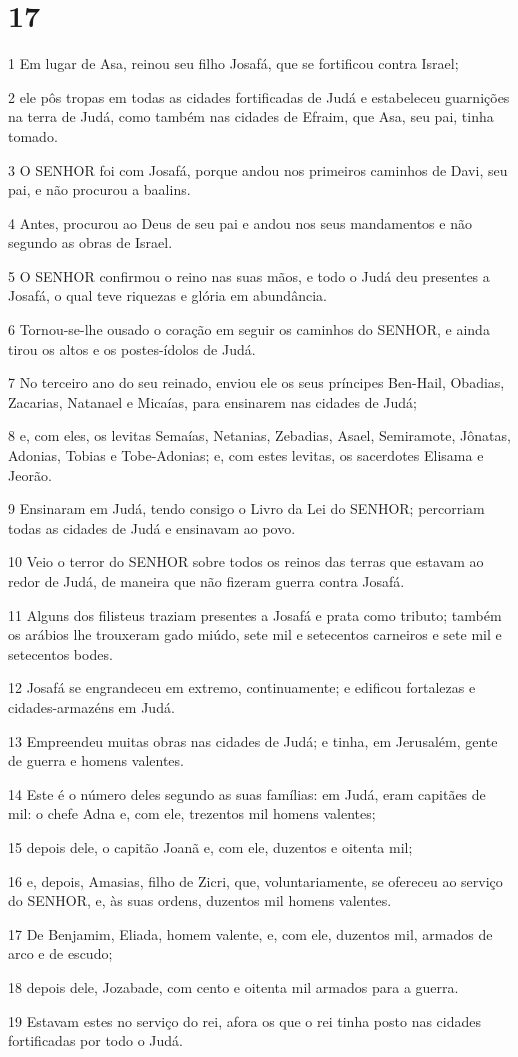 \chapter{17}

\par 1 Em lugar de Asa, reinou seu filho Josafá, que se fortificou contra Israel;
\par 2 ele pôs tropas em todas as cidades fortificadas de Judá e estabeleceu guarnições na terra de Judá, como também nas cidades de Efraim, que Asa, seu pai, tinha tomado.
\par 3 O SENHOR foi com Josafá, porque andou nos primeiros caminhos de Davi, seu pai, e não procurou a baalins.
\par 4 Antes, procurou ao Deus de seu pai e andou nos seus mandamentos e não segundo as obras de Israel.
\par 5 O SENHOR confirmou o reino nas suas mãos, e todo o Judá deu presentes a Josafá, o qual teve riquezas e glória em abundância.
\par 6 Tornou-se-lhe ousado o coração em seguir os caminhos do SENHOR, e ainda tirou os altos e os postes-ídolos de Judá.
\par 7 No terceiro ano do seu reinado, enviou ele os seus príncipes Ben-Hail, Obadias, Zacarias, Natanael e Micaías, para ensinarem nas cidades de Judá;
\par 8 e, com eles, os levitas Semaías, Netanias, Zebadias, Asael, Semiramote, Jônatas, Adonias, Tobias e Tobe-Adonias; e, com estes levitas, os sacerdotes Elisama e Jeorão.
\par 9 Ensinaram em Judá, tendo consigo o Livro da Lei do SENHOR; percorriam todas as cidades de Judá e ensinavam ao povo.
\par 10 Veio o terror do SENHOR sobre todos os reinos das terras que estavam ao redor de Judá, de maneira que não fizeram guerra contra Josafá.
\par 11 Alguns dos filisteus traziam presentes a Josafá e prata como tributo; também os arábios lhe trouxeram gado miúdo, sete mil e setecentos carneiros e sete mil e setecentos bodes.
\par 12 Josafá se engrandeceu em extremo, continuamente; e edificou fortalezas e cidades-armazéns em Judá.
\par 13 Empreendeu muitas obras nas cidades de Judá; e tinha, em Jerusalém, gente de guerra e homens valentes.
\par 14 Este é o número deles segundo as suas famílias: em Judá, eram capitães de mil: o chefe Adna e, com ele, trezentos mil homens valentes;
\par 15 depois dele, o capitão Joanã e, com ele, duzentos e oitenta mil;
\par 16 e, depois, Amasias, filho de Zicri, que, voluntariamente, se ofereceu ao serviço do SENHOR, e, às suas ordens, duzentos mil homens valentes.
\par 17 De Benjamim, Eliada, homem valente, e, com ele, duzentos mil, armados de arco e de escudo;
\par 18 depois dele, Jozabade, com cento e oitenta mil armados para a guerra.
\par 19 Estavam estes no serviço do rei, afora os que o rei tinha posto nas cidades fortificadas por todo o Judá.

